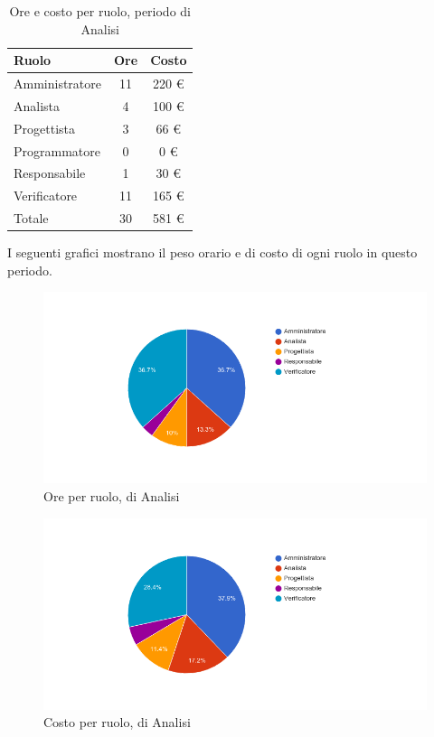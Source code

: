 \begin{table}[H]
	\centering
	\begin{tabular}{ l c c }
		\textbf{Ruolo} & \textbf{Ore} & \textbf{Costo} \\
		\hline
		Amministratore & 11 & 220 \euro{} \\
		Analista & 4 & 100 \euro{} \\
		Progettista & 3 & 66 \euro{} \\
		Programmatore & 0 & 0 \euro{} \\
		Responsabile & 1 & 30 \euro{} \\
		Verificatore & 11 & 165 \euro{} \\
		\hline
		Totale & 30 & 581 \euro{} \\
		\hline
	\end{tabular}
	\caption{Ore e costo per ruolo, periodo di Analisi}
\end{table}

I seguenti grafici mostrano il peso orario e di costo di ogni ruolo in questo periodo.

\begin{figure}[H]
  \begin{center}
    \includegraphics[width=15cm]{res/img/prospettoEconomico/orePerRuoloAnalisiMiglioramenti.png}
  \caption{Ore per ruolo,  di Analisi}
  \end{center} 
\end{figure}  

\begin{figure}[H]
  \begin{center}
    \includegraphics[width=15cm]{res/img/prospettoEconomico/costoPerRuoloAnalisiMiglioramenti.png}
  \caption{Costo per ruolo,  di Analisi}
  \end{center} 
\end{figure}  


